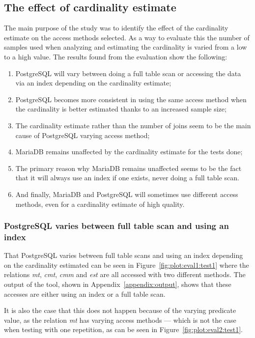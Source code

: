 \subsection{The effect of cardinality estimate}
The main purpose of the study was to identify the effect of the cardinality
estimate on the access methods selected. As a way to evaluate this the number of
samples used when analyzing and estimating the cardinality is varied from a low
to a high value. The results found from the evaluation show the following:
\begin{enumerate}
\item PostgreSQL will vary between doing a full table scan or accessing the data
  via an index depending on the cardinality estimate;
\item PostgreSQL becomes more consistent in using the same access method when
  the cardinality is better estimated thanks to an increased sample size;
\item The cardinality estimate rather than the number of joins seem to be the
  main cause of PostgreSQL varying access method;
\item MariaDB remains unaffected by the cardinality estimate for the tests done;
\item The primary reason why MariaDB remains unaffected seems to be the fact
  that it will always use an index if one exists, never doing a full table scan.
\item And finally, MariaDB and PostgreSQL will sometimes use different access
  methods, even for a cardinality estimate of high quality.
\end{enumerate}

\subsubsection{PostgreSQL varies between full table scan and using an index}
That PostgreSQL varies between full table scans and using an index depending on
the cardinality estimated can be seen in Figure~\ref{fig:plot:eval1:test1} where
the relations \textit{mt}, \textit{cmt}, \textit{cmm} and \textit{est} are all
accessed with two different methods. The output of the tool, shown in
Appendix~\ref{appendix:output}, shows that these accesses are
either using an index or a full table scan.

It is also the case that this does not happen because of the varying predicate
value, as the relation \textit{mt} has varying access methods --- which is not
the case when testing with one repetition, as can be seen in
Figure~\ref{fig:plot:eval2:test1}.

